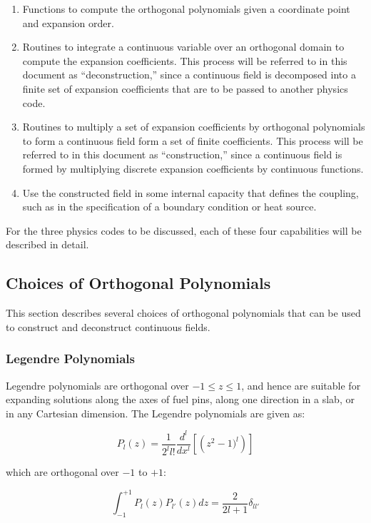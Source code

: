 \documentclass[10pt]{article}
\newcommand{\beq}{\begin{equation}}
\newcommand{\eeq}{\end{equation}}
\numberwithin{equation}{section} %
\begin{document}
\begin{enumerate}
\item Functions to compute the orthogonal polynomials given a coordinate point and expansion order.
\item Routines to integrate a continuous variable over an orthogonal domain to compute the expansion coefficients. This process will be referred to in this document as ``deconstruction,'' since a continuous field is decomposed into a finite set of expansion coefficients that are to be passed to another physics code.
\item Routines to multiply a set of expansion coefficients by orthogonal polynomials to form a continuous field form a set of finite coefficients. This process will be referred to in this document as ``construction,'' since a continuous field is formed by multiplying discrete expansion coefficients by continuous functions.
\item Use the constructed field in some internal capacity that defines the coupling, such as in the specification of a boundary condition or heat source.
\end{enumerate}

For the three physics codes to be discussed, each of these four capabilities will be described in detail.

\subsection{Choices of Orthogonal Polynomials}
\label{sec:Polynomials}
This section describes several choices of orthogonal polynomials that can be used to construct and deconstruct continuous fields.

\subsubsection{Legendre Polynomials}

Legendre polynomials are orthogonal over \( -1 \leq z \leq 1\), and hence are suitable for expanding solutions along the axes of fuel pins, along one direction in a slab, or in any Cartesian dimension. The Legendre polynomials are given as:

\beq
\label{eq:Legendre}
P_l(z)=\frac{1}{2^ll!}\frac{d^l}{dx^l}\left\lbrack\left(z^2-1)^l\right)\right\rbrack
\eeq

which are orthogonal over \(-1\) to \(+1\):

\beq
\int_{-1}^{+1}P_l(z)P_{l'}(z)dz=\frac{2}{2l+1}\delta_{ll'}
\eeq
\end{document}
